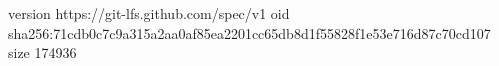 version https://git-lfs.github.com/spec/v1
oid sha256:71cdb0c7c9a315a2aa0af85ea2201cc65db8d1f55828f1e53e716d87c70cd107
size 174936
